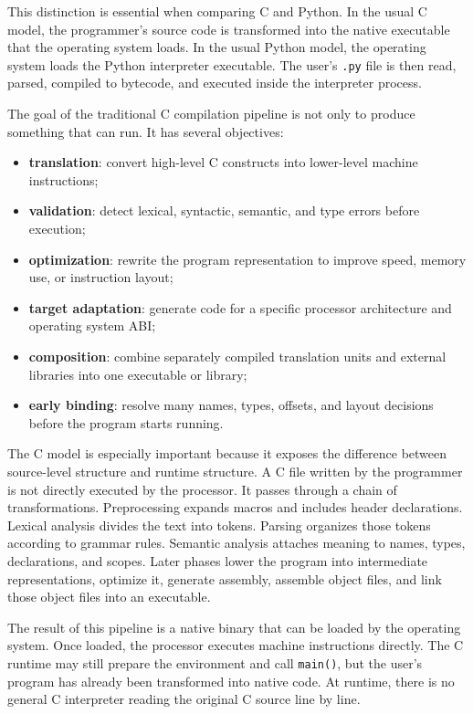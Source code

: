 This distinction is essential when comparing C and Python. In the usual C model, the programmer's source code is transformed into the native executable that the operating system loads. In the usual Python model, the operating system loads the Python interpreter executable. The user's \texttt{.py} file is then read, parsed, compiled to bytecode, and executed inside the interpreter process.

The goal of the traditional C compilation pipeline is not only to produce something that can run. It has several objectives:

\begin{itemize}
    \item \textbf{translation}: convert high-level C constructs into lower-level machine instructions;
    \item \textbf{validation}: detect lexical, syntactic, semantic, and type errors before execution;
    \item \textbf{optimization}: rewrite the program representation to improve speed, memory use, or instruction layout;
    \item \textbf{target adaptation}: generate code for a specific processor architecture and operating system ABI;
    \item \textbf{composition}: combine separately compiled translation units and external libraries into one executable or library;
    \item \textbf{early binding}: resolve many names, types, offsets, and layout decisions before the program starts running.
\end{itemize}

The C model is especially important because it exposes the difference between source-level structure and runtime structure. A C file written by the programmer is not directly executed by the processor. It passes through a chain of transformations. Preprocessing expands macros and includes header declarations. Lexical analysis divides the text into tokens. Parsing organizes those tokens according to grammar rules. Semantic analysis attaches meaning to names, types, declarations, and scopes. Later phases lower the program into intermediate representations, optimize it, generate assembly, assemble object files, and link those object files into an executable.

The result of this pipeline is a native binary that can be loaded by the operating system. Once loaded, the processor executes machine instructions directly. The C runtime may still prepare the environment and call \texttt{main()}, but the user's program has already been transformed into native code. At runtime, there is no general C interpreter reading the original C source line by line.

